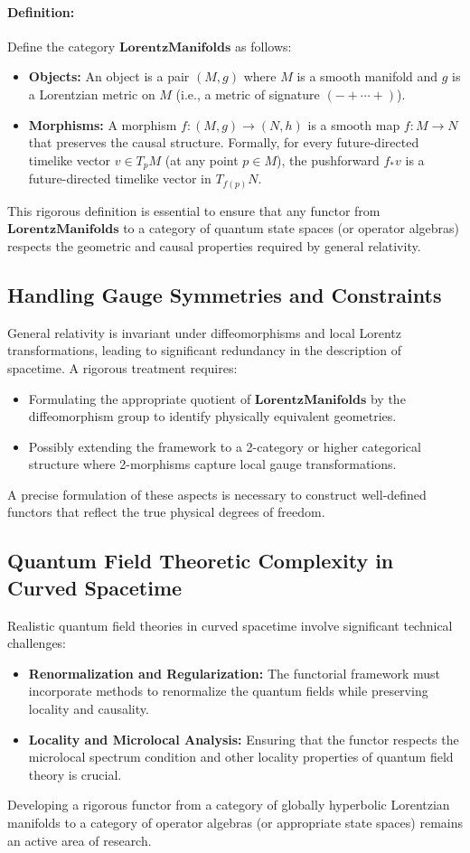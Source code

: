 \documentclass[12pt]{article}
\begin{document}
\paragraph{Definition:}  
Define the category \(\mathbf{LorentzManifolds}\) as follows:
\begin{itemize}
    \item \textbf{Objects:} An object is a pair \((M, g)\) where \(M\) is a smooth manifold and \(g\) is a Lorentzian metric on \(M\) (i.e., a metric of signature \((-+\cdots+)\)).
    \item \textbf{Morphisms:} A morphism \(f: (M, g) \to (N, h)\) is a smooth map \(f: M \to N\) that preserves the causal structure. Formally, for every future-directed timelike vector \(v \in T_pM\) (at any point \(p \in M\)), the pushforward \(f_* v\) is a future-directed timelike vector in \(T_{f(p)}N\).
\end{itemize}
This rigorous definition is essential to ensure that any functor from \(\mathbf{LorentzManifolds}\) to a category of quantum state spaces (or operator algebras) respects the geometric and causal properties required by general relativity.

\subsection{Handling Gauge Symmetries and Constraints}
General relativity is invariant under diffeomorphisms and local Lorentz transformations, leading to significant redundancy in the description of spacetime. A rigorous treatment requires:
\begin{itemize}
    \item Formulating the appropriate quotient of \(\mathbf{LorentzManifolds}\) by the diffeomorphism group to identify physically equivalent geometries.
    \item Possibly extending the framework to a 2-category or higher categorical structure where 2-morphisms capture local gauge transformations.
\end{itemize}
A precise formulation of these aspects is necessary to construct well-defined functors that reflect the true physical degrees of freedom.

\subsection{Quantum Field Theoretic Complexity in Curved Spacetime}
Realistic quantum field theories in curved spacetime involve significant technical challenges:
\begin{itemize}
    \item \textbf{Renormalization and Regularization:} The functorial framework must incorporate methods to renormalize the quantum fields while preserving locality and causality.
    \item \textbf{Locality and Microlocal Analysis:} Ensuring that the functor respects the microlocal spectrum condition and other locality properties of quantum field theory is crucial.
\end{itemize}
Developing a rigorous functor from a category of globally hyperbolic Lorentzian manifolds to a category of operator algebras (or appropriate state spaces) remains an active area of research.
\end{document}
